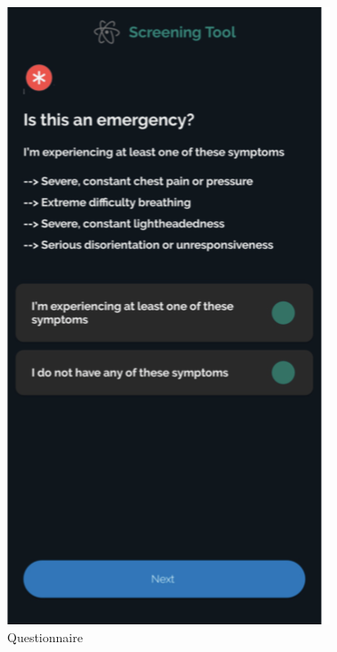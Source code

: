 \begin{center}
\includegraphics[scale=0.55]{screen.png}\\[0.75cm]
\caption{Questionnaire}
\end{center}
